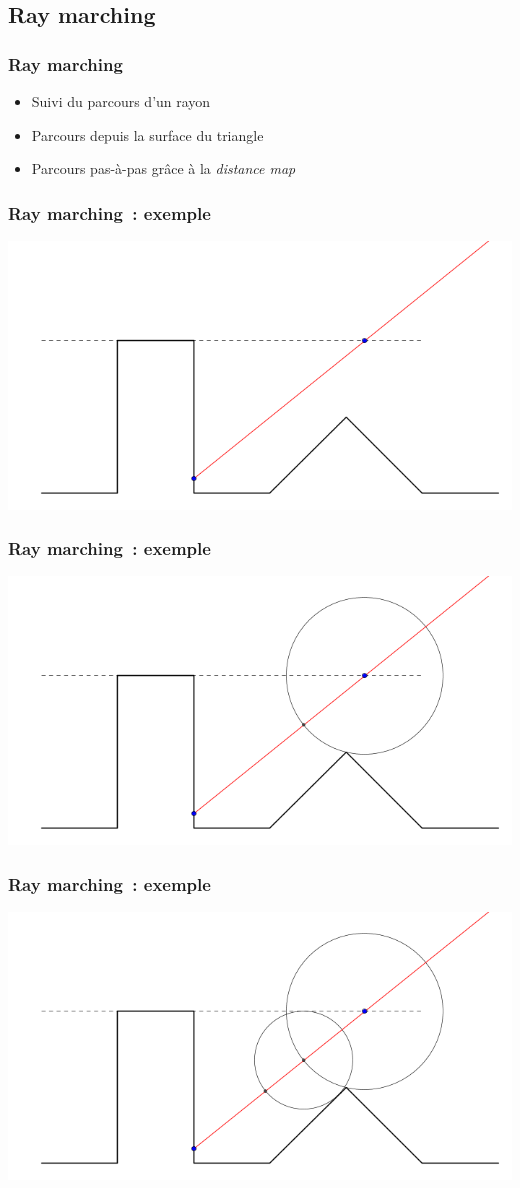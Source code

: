 \documentclass{beamer}
\begin{document}
\subsection{Ray marching}
\begin{frame}
    \frametitle{Ray marching}
    \begin{itemize}
        \item Suivi du parcours d'un rayon
        \item Parcours depuis la surface du triangle
        \item Parcours pas-à-pas grâce à la \emph{distance map}
    \end{itemize}
\end{frame}
\begin{frame}
    \frametitle{Ray marching~: exemple}
    \includegraphics[width=\textwidth]{images/rayTracing-0}
\end{frame}
\begin{frame}
    \frametitle{Ray marching~: exemple}
    \includegraphics[width=\textwidth]{images/rayTracing-1}
\end{frame}
\begin{frame}
    \frametitle{Ray marching~: exemple}
    \includegraphics[width=\textwidth]{images/rayTracing-2}
\end{frame}
\end{document}
